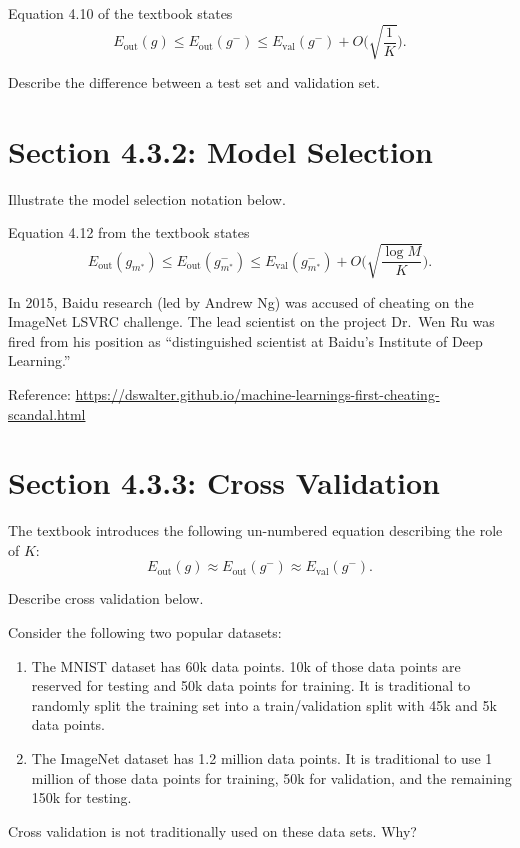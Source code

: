 \documentclass[10pt]{exam}
\theoremstyle{definition}
\newcommand{\Eout}{E_{\text{out}}}
\newcommand{\Eval}{E_{\text{val}}}
\begin{document}
\vspace{4in}
\noindent
Equation 4.10 of the textbook states
\begin{equation*}
    \Eout(g) \le \Eout(g^-) \le \Eval(g^-) + O\bigg(\sqrt{\frac 1 {K}}\bigg)
    .
\end{equation*}

\vspace{2.5in}
Describe the difference between a test set and validation set.

\newpage
\section*{Section 4.3.2: Model Selection}

Illustrate the model selection notation below.

\vspace{4in}

\noindent
Equation 4.12 from the textbook states 
\begin{equation*}
    \Eout(g_{m^*}) \le
    \Eout(g^{-}_{m^*}) \le \Eval(g^-_{m^*}) + O\bigg(\sqrt{\frac{\log M}{K}}\bigg).
\end{equation*}

\newpage
\noindent
In 2015, Baidu research (led by Andrew Ng) was accused of cheating on the ImageNet LSVRC challenge.
The lead scientist on the project Dr.\ Wen Ru was fired from his position as ``distinguished scientist at Baidu's Institute of Deep Learning.''

Reference:
\url{https://dswalter.github.io/machine-learnings-first-cheating-scandal.html}

\newpage
\section*{Section 4.3.3: Cross Validation}

The textbook introduces the following un-numbered equation describing the role of $K$:
\begin{equation*}
    \Eout(g) \approx \Eout(g^-) \approx \Eval(g^-).
\end{equation*}

\vspace{3in}
\noindent
Describe cross validation below.

\newpage
\noindent
Consider the following two popular datasets:
\begin{enumerate}
    \item
        The MNIST dataset has 60k data points.
        10k of those data points are reserved for testing
        and 50k data points for training.
        It is traditional to randomly split the training set into a train/validation split with 45k and 5k data points.

    \item
        The ImageNet dataset has 1.2 million data points.
        It is traditional to use 1 million of those data points for training,
        50k for validation,
        and the remaining 150k for testing.
\end{enumerate}
Cross validation is not traditionally used on these data sets.
Why?
\newpage
\end{document}
